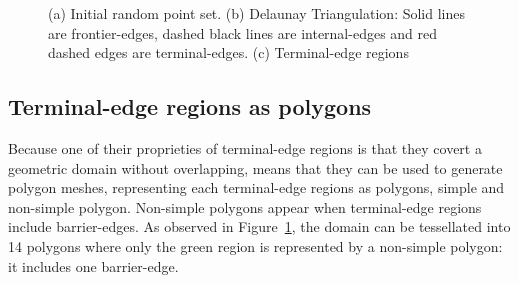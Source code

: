 \begin{figure}[h]
\centering     %
{} 
\caption{(a) Initial random point set. (b) Delaunay Triangulation: Solid lines are frontier-edges, dashed black lines are internal-edges and red dashed edges are terminal-edges. (c) Terminal-edge regions}
\label{fig:general_example} 
\end{figure}

\subsection{Terminal-edge regions as  polygons}


Because one of their proprieties of terminal-edge regions is that they covert a geometric domain without overlapping, means that they can be used to generate polygon meshes, representing each terminal-edge regions as polygons, simple and non-simple polygon. Non-simple polygons appear when terminal-edge regions include barrier-edges.  As observed in Figure~\ref{fig:general_example}, the domain can be tessellated into 14 polygons where only the green region is represented by a  non-simple polygon: it includes one barrier-edge. 



